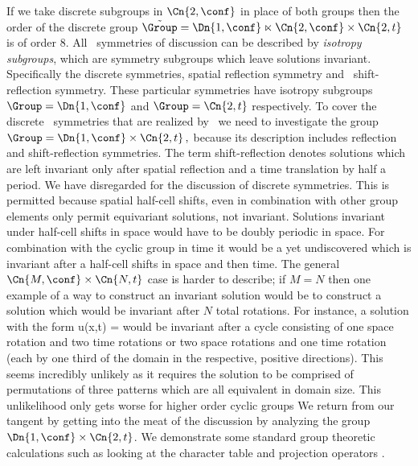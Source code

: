 If we take discrete subgroups in $\Cn{2,\conf}$ in place of both  groups
then the order of the discrete group
\(
\tilde{\Group} = \Dn{1,\conf} \ltimes \Cn{2,\conf} \times \Cn{2,t}
\)
is of order $8$.
All \spt\ symmetries of discussion can be described by \emph{isotropy subgroups},
which are symmetry subgroups which leave solutions invariant.
Specifically the discrete symmetries,
spatial reflection symmetry and \spt\ shift-reflection symmetry. These particular
symmetries have isotropy subgroups
\(
\Group = \Dn{1,\conf}
\)
and
\(
\Group = \Cn{2,t}
\)
respectively. To cover the discrete \spt\ symmetries that
are realized by \twots\ we need to investigate the group
\(
\Group = \Dn{1,\conf} \times \Cn{2,t}\,,
\)
because its description includes
reflection and shift-reflection symmetries. The term shift-reflection
denotes solutions which are left invariant only after spatial reflection
and a time translation by half a period. We have disregarded
 for the discussion of discrete symmetries. This is
permitted because spatial half-cell shifts, even in combination
with other group elements only permit equivariant solutions,
not invariant. Solutions invariant under half-cell shifts in
space would have to be doubly periodic in space. For combination
with the cyclic group in time it would be a yet undiscovered
\twot which is invariant after a half-cell shifts in space and
then time. The general $\Cn{M,\conf} \times \Cn{N,t}$ case
is harder to describe; if $M=N$ then one example of a way
to construct an invariant solution would be to construct
a solution which would be invariant after $N$ total rotations.
For instance, a solution with the form
\beq
u(x,t) =\left[\begin{array}{c}
1\,2\,3 \\
3\,1\,2 \\
2\,3\,1
\end{array}\right]
would be invariant after a cycle consisting of
one space rotation and two time rotations or
two space rotations and one time rotation (each by one third
of the domain in the respective, positive directions). This
seems incredibly unlikely as it requires the solution to be comprised of
permutations of three patterns which are all equivalent in domain size.
This unlikelihood only gets worse for higher order cyclic groups
We return from our tangent by getting into the meat of the
discussion by analyzing the group $ \Dn{1,\conf} \times \Cn{2,t}$.
We demonstrate some standard group theoretic calculations such as
looking at the character table  and projection operators
.


